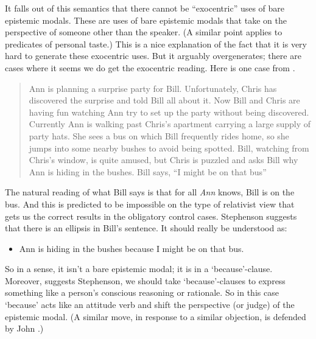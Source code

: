It falls out of this semantics that there cannot be ``exocentric'' uses of bare epistemic modals. These are uses of bare epistemic modals that take on the perspective of someone other than the speaker. (A similar point applies to predicates of personal taste.) This is a nice explanation of the fact that it is very hard to generate these exocentric uses. But it arguably overgenerates; there are cases where it seems we do get the exocentric reading. Here is one case from  \citet{Egan2005-EGAEMI}.

\begin{quote}

Ann is planning a surprise party for Bill. Unfortunately, Chris has discovered the surprise and told Bill all about it. Now Bill and Chris are having fun watching Ann try to set up the party without being discovered. Currently Ann is walking past Chris's apartment carrying a large supply of party hats. She sees a bus on which Bill frequently rides home, so she jumps into some nearby bushes to avoid being spotted. Bill, watching from Chris's window, is quite amused, but Chris is puzzled and asks Bill why Ann is hiding in the bushes. Bill says, ``I might be on that bus'' ~\citep[140]{Egan2005-EGAEMI}
\end{quote}
The natural reading of what Bill says is that for all \emph{Ann} knows, Bill is on the bus. And this is predicted to be impossible on the type of relativist view that gets us the correct results in the obligatory control cases. Stephenson suggests that there is an ellipsis in Bill's sentence. It should really be understood as:

\begin{itemize}
\item Ann is hiding in the bushes because I might be on that bus.

\end{itemize}
So in a sense, it isn't a bare epistemic modal; it is in a `because'-clause. Moreover, suggests Stephenson, we should take `because'-clauses to express something like a person's conscious reasoning or rationale. So in this case `because' acts like an attitude verb and shift the perspective (or judge) of the epistemic modal. (A similar move, in response to a similar objection, is defended by John  \citet[272ff]{MacFarlane2014}.) 

